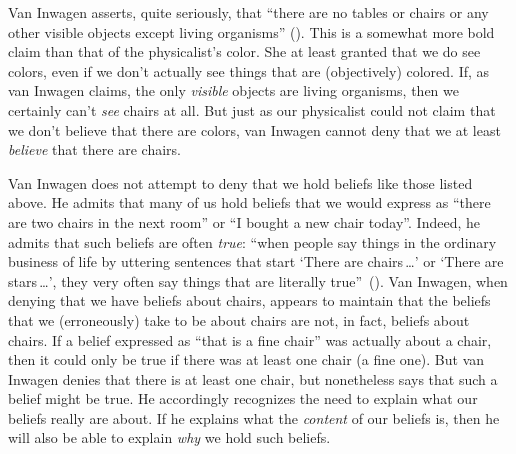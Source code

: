 \documentclass[11pt]{standalone}
\begin{document}
\begin{spacing}{1.5}
Van Inwagen asserts, quite seriously, that ``there are no tables or
chairs or any other visible objects except living organisms''
(\citeyear[1]{inwagen1995}).  This is a somewhat more bold claim than
that of the physicalist's color.  She at least granted that we do see
colors, even if we don't actually see things that are (objectively)
colored.  If, as van Inwagen claims, the only {\em visible} objects
are living organisms, then we certainly can't {\em see} chairs at all.
But just as our physicalist could not claim that we don't believe that
there are colors, van Inwagen cannot deny that we at least {\em
  believe} that there are chairs.

Van Inwagen does not attempt to deny that we hold beliefs like those
listed above.  He admits that many of us hold beliefs that we would
express as ``there are two chairs in the next room'' or ``I bought a
new chair today''.  Indeed, he admits that such beliefs are often {\em
  true}: ``when people say things in the ordinary business of life by
uttering sentences that start `There are chairs\,\ldots ' or `There
are stars\,\ldots ', they very often say things that are literally
true''~(\citeyear[102]{inwagen1995}).  Van Inwagen, when denying that
we have beliefs about chairs, appears to maintain that the beliefs
that we (erroneously) take to be about chairs are not, in fact,
beliefs about chairs.  If a belief expressed as ``that is a fine
chair'' was actually about a chair, then it could only be true if
there was at least one chair (a fine one).  But van Inwagen denies
that there is at least one chair, but nonetheless says that such a
belief might be true.  He accordingly recognizes the need to explain
what our beliefs really are about.  If he explains what the {\em
  content} of our beliefs is, then he will also be able to explain
{\em why} we hold such beliefs.

\ifstandalone
\end{spacing}


\fi
\end{document}
